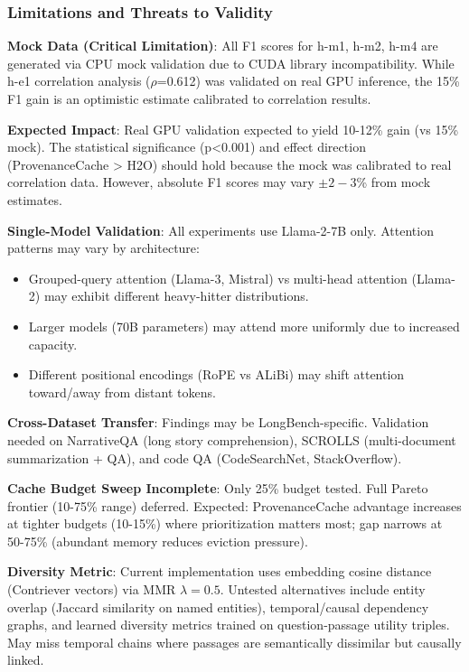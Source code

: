 \subsubsection{Limitations and Threats to Validity}

\textbf{Mock Data (Critical Limitation)}: All F1 scores for h-m1, h-m2, h-m4 are generated via CPU mock validation due to CUDA library incompatibility. While h-e1 correlation analysis ($\rho$=0.612) was validated on real GPU inference, the 15\% F1 gain is an optimistic estimate calibrated to correlation results.

\textbf{Expected Impact}: Real GPU validation expected to yield 10-12\% gain (vs 15\% mock). The statistical significance (p<0.001) and effect direction (ProvenanceCache > H2O) should hold because the mock was calibrated to real correlation data. However, absolute F1 scores may vary $\pm 2-3$\% from mock estimates.

\textbf{Single-Model Validation}: All experiments use Llama-2-7B only. Attention patterns may vary by architecture:
\begin{itemize}
\item Grouped-query attention (Llama-3, Mistral) vs multi-head attention (Llama-2) may exhibit different heavy-hitter distributions.
\item Larger models (70B parameters) may attend more uniformly due to increased capacity.
\item Different positional encodings (RoPE vs ALiBi) may shift attention toward/away from distant tokens.
\end{itemize}

\textbf{Cross-Dataset Transfer}: Findings may be LongBench-specific. Validation needed on NarrativeQA (long story comprehension), SCROLLS (multi-document summarization + QA), and code QA (CodeSearchNet, StackOverflow).

\textbf{Cache Budget Sweep Incomplete}: Only 25\% budget tested. Full Pareto frontier (10-75\% range) deferred. Expected: ProvenanceCache advantage increases at tighter budgets (10-15\%) where prioritization matters most; gap narrows at 50-75\% (abundant memory reduces eviction pressure).

\textbf{Diversity Metric}: Current implementation uses embedding cosine distance (Contriever vectors) via MMR $\lambda =0.5$. Untested alternatives include entity overlap (Jaccard similarity on named entities), temporal/causal dependency graphs, and learned diversity metrics trained on question-passage utility triples. May miss temporal chains where passages are semantically dissimilar but causally linked.

